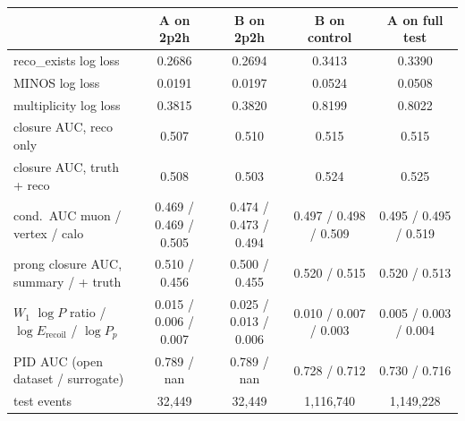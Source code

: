 \begin{tabular}{lcccc}
\toprule
 & A on 2p2h & B on 2p2h & B on control & A on full test \\
\midrule
reco\_exists log loss & 0.2686 & 0.2694 & 0.3413 & 0.3390 \\
MINOS log loss & 0.0191 & 0.0197 & 0.0524 & 0.0508 \\
multiplicity log loss & 0.3815 & 0.3820 & 0.8199 & 0.8022 \\
closure AUC, reco only & 0.507 & 0.510 & 0.515 & 0.515 \\
closure AUC, truth + reco & 0.508 & 0.503 & 0.524 & 0.525 \\
cond.\ AUC muon / vertex / calo & 0.469 / 0.469 / 0.505 & 0.474 / 0.473 / 0.494 & 0.497 / 0.498 / 0.509 & 0.495 / 0.495 / 0.519 \\
prong closure AUC, summary / + truth & 0.510 / 0.456 & 0.500 / 0.455 & 0.520 / 0.515 & 0.520 / 0.513 \\
$W_1$ $\log P$ ratio / $\log E_\mathrm{recoil}$ / $\log P_p$ & 0.015 / 0.006 / 0.007 & 0.025 / 0.013 / 0.006 & 0.010 / 0.007 / 0.003 & 0.005 / 0.003 / 0.004 \\
PID AUC (open dataset / surrogate) & 0.789 / nan & 0.789 / nan & 0.728 / 0.712 & 0.730 / 0.716 \\
test events & 32,449 & 32,449 & 1,116,740 & 1,149,228 \\
\bottomrule
\end{tabular}
